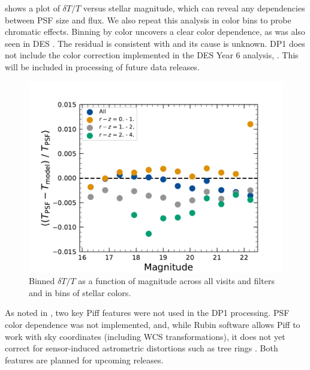  shows a plot of  $\delta T/T$ versus stellar magnitude, which can reveal any dependencies between \gls{PSF} size and flux.
We also repeat this analysis in color bins to probe chromatic effects.
Binning by color uncovers a clear color dependence, as was also seen in \gls{DES} \citep{DES:2020vau}.
The residual is consistent with  and its cause is unknown.
DP1 does not include the color correction implemented in the DES Year 6 analysis, \citet{2025OJAp....8E..26S}. 
This will be included in processing of future data releases.
\begin{figure}[htb!]
\includegraphics[width=\linewidth]{dT_T_Piff_poly_4_vs_mag}
\caption{Binned $\delta T/T$ as a function of magnitude across all visits and filters and in bins of stellar colors.}
\label{fig:psf_residuals_mag_color}
\end{figure}

As noted in  \cite{PSTN-019}, two key Piff features were not used in the DP1 processing.
PSF color dependence was not implemented, and, while Rubin software allows Piff to work with sky coordinates (including WCS transformations), 
it does not yet correct for sensor-induced astrometric distortions such as tree rings \citep{2017JInst..12C5015P}.
Both features are planned for upcoming releases.

